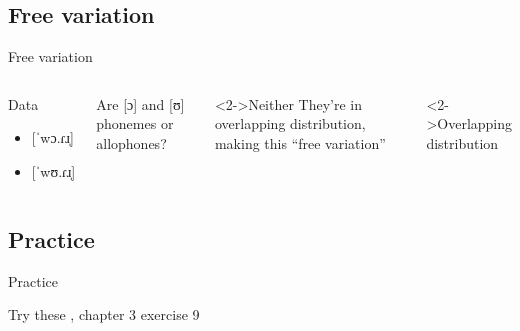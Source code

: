 \documentclass{beamer}
\newcommand{\subtwothree}{Free variation}
\newcommand{\subtwofour}{Practice}
\begin{document}
    \subsection{\subtwothree}
      \begin{frame}{\subtwothree}
        \begin{columns}
            \begin{block}{Data}
              \begin{itemize}
                \item {[}ˈwɔ.ɾɹ̩]
                \item {[}ˈwʊ.ɾɹ̩]
              \end{itemize}
            \end{block}
            \begin{block}{}
              Are [ɔ] and [ʊ] phonemes or allophones?
            \end{block}
            \begin{block}<2->{Neither}
              They're in overlapping distribution, making this ``free variation''
            \end{block}
            \begin{alertblock}<2->{Overlapping distribution}
              
            \end{alertblock}
        \end{columns}
      \end{frame}

    \subsection{\subtwofour}
      \begin{frame}{\subtwofour}
        \begin{block}{Try these}
          \textcite{dawson_language_2016}, chapter 3 exercise 9
        \end{block}
      \end{frame}
\end{document}

